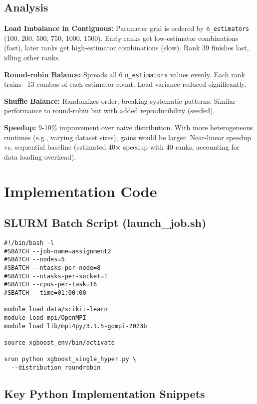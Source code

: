 \documentclass[sigplan,screen]{acmart}
\begin{document}
\subsection{Analysis}

\textbf{Load Imbalance in Contiguous:} Parameter grid is ordered by
\texttt{n\_estimators} (100, 200, 500, 750, 1000, 1500). Early ranks get
low-estimator combinations (fast), later ranks get high-estimator
combinations (slow). Rank 39 finishes last, idling other ranks.

\textbf{Round-robin Balance:} Spreads all 6 \texttt{n\_estimators}
values evenly. Each rank trains ~13 combos of each estimator count. Load
variance reduced significantly.

\textbf{Shuffle Balance:} Randomizes order, breaking systematic patterns.
Similar performance to round-robin but with added reproducibility
(seeded).

\textbf{Speedup:} 9-10\% improvement over naive distribution. With more
heterogeneous runtimes (e.g., varying dataset sizes), gains would be
larger. Near-linear speedup vs. sequential baseline (estimated 40×
speedup with 40 ranks, accounting for data loading overhead).

\section{Implementation Code}
\label{sec:code}

\subsection{SLURM Batch Script (launch\_job.sh)}

\begin{verbatim}
#!/bin/bash -l
#SBATCH --job-name=assignment2
#SBATCH --nodes=5
#SBATCH --ntasks-per-node=8
#SBATCH --ntasks-per-socket=1
#SBATCH --cpus-per-task=16
#SBATCH --time=01:00:00

module load data/scikit-learn
module load mpi/OpenMPI
module load lib/mpi4py/3.1.5-gompi-2023b

source xgboost_env/bin/activate

srun python xgboost_single_hyper.py \
  --distribution roundrobin
\end{verbatim}

\subsection{Key Python Implementation Snippets}
\end{document}
